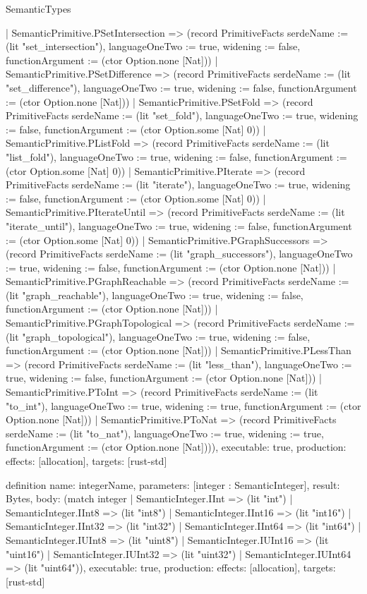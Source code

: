 \begin{lexlean}{SemanticTypes}
\begin{semanticmodule}
{    | SemanticPrimitive.PSetIntersection => (record PrimitiveFacts {serdeName := (lit "set_intersection"), languageOneTwo := true, widening := false, functionArgument := (ctor Option.none [Nat])})
    | SemanticPrimitive.PSetDifference => (record PrimitiveFacts {serdeName := (lit "set_difference"), languageOneTwo := true, widening := false, functionArgument := (ctor Option.none [Nat])})
    | SemanticPrimitive.PSetFold => (record PrimitiveFacts {serdeName := (lit "set_fold"), languageOneTwo := true, widening := false, functionArgument := (ctor Option.some [Nat] 0)})
    | SemanticPrimitive.PListFold => (record PrimitiveFacts {serdeName := (lit "list_fold"), languageOneTwo := true, widening := false, functionArgument := (ctor Option.some [Nat] 0)})
    | SemanticPrimitive.PIterate => (record PrimitiveFacts {serdeName := (lit "iterate"), languageOneTwo := true, widening := false, functionArgument := (ctor Option.some [Nat] 0)})
    | SemanticPrimitive.PIterateUntil => (record PrimitiveFacts {serdeName := (lit "iterate_until"), languageOneTwo := true, widening := false, functionArgument := (ctor Option.some [Nat] 0)})
    | SemanticPrimitive.PGraphSuccessors => (record PrimitiveFacts {serdeName := (lit "graph_successors"), languageOneTwo := true, widening := false, functionArgument := (ctor Option.none [Nat])})
    | SemanticPrimitive.PGraphReachable => (record PrimitiveFacts {serdeName := (lit "graph_reachable"), languageOneTwo := true, widening := false, functionArgument := (ctor Option.none [Nat])})
    | SemanticPrimitive.PGraphTopological => (record PrimitiveFacts {serdeName := (lit "graph_topological"), languageOneTwo := true, widening := false, functionArgument := (ctor Option.none [Nat])})
    | SemanticPrimitive.PLessThan => (record PrimitiveFacts {serdeName := (lit "less_than"), languageOneTwo := true, widening := false, functionArgument := (ctor Option.none [Nat])})
    | SemanticPrimitive.PToInt => (record PrimitiveFacts {serdeName := (lit "to_int"), languageOneTwo := true, widening := true, functionArgument := (ctor Option.none [Nat])})
    | SemanticPrimitive.PToNat => (record PrimitiveFacts {serdeName := (lit "to_nat"), languageOneTwo := true, widening := true, functionArgument := (ctor Option.none [Nat])})),
  executable: true,
  production: {effects: [allocation], targets: [rust-std]}
}

definition{
  name: integerName,
  parameters: [integer : SemanticInteger],
  result: Bytes,
  body: (match integer
    | SemanticInteger.IInt => (lit "int")
    | SemanticInteger.IInt8 => (lit "int8")
    | SemanticInteger.IInt16 => (lit "int16")
    | SemanticInteger.IInt32 => (lit "int32")
    | SemanticInteger.IInt64 => (lit "int64")
    | SemanticInteger.IUInt8 => (lit "uint8")
    | SemanticInteger.IUInt16 => (lit "uint16")
    | SemanticInteger.IUInt32 => (lit "uint32")
    | SemanticInteger.IUInt64 => (lit "uint64")),
  executable: true,
  production: {effects: [allocation], targets: [rust-std]}
}


\end{semanticmodule}
\end{lexlean}
